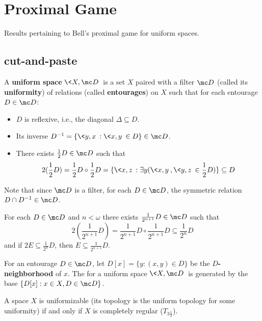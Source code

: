 
\chapter{Proximal Game}

Results pertaining to Bell's proximal game for uniform spaces.

\section{cut-and-paste}


\begin{defn}
  A \textbf{uniform space} $\<X,\mc D\>$ is a set $X$ paired with a filter $\mc D$ (called its \textbf{uniformity}) of relations (called \textbf{entourages}) on $X$ such that for each entourage $D\in \mc D$:
    \begin{itemize}
      \item $D$ is reflexive, i.e., the diagonal $\Delta\subseteq D$.
      \item Its inverse $D^{-1}=\{\<y,x\>:\<x,y\>\in D\}\in \mc D$.
      \item There exists $\frac{1}{2}D\in\mc D$ such that
        \[
          2(\frac{1}{2}D)=\frac{1}{2}D\circ\frac{1}{2}D=\{\<x,z\>:\exists y(\<x,y\>,\<y,z\>\in\frac{1}{2}D)\}\subseteq D
        \]
    \end{itemize}
  Note that since $\mc D$ is a filter, for each $D\in\mc D$, the symmetric relation $D\cap D^{-1}\in \mc D$.
\end{defn}

\begin{prop}
For each $D\in\mc D$ and $n<\omega$ there exists $\frac{1}{2^{n+1}}D\in\mc D$ such that
  \[2(\frac{1}{2^{n+1}}D)=\frac{1}{2^{n+1}}D\circ \frac{1}{2^{n+1}}D\subseteq \frac{1}{2^{n}}D\]
and if $2E\subseteq \frac{1}{2^{n}}D$, then $E\subseteq \frac{1}{2^{n+1}}D$.
\end{prop}

\begin{defn}
  For an entourage $D\in\mc D$, let $D[x]=\{y:(x,y)\in D\}$ be the \textbf{$D$-neighborhood} of $x$. The  for a uniform space $\<X,\mc D\>$ is generated by the base $\{D[x]:x\in X,D\in\mc D\}$.
\end{defn}

\begin{thm}
  A space $X$ is uniformizable (its topology is the uniform topology for some uniformity) if and only if $X$ is completely regular ($T_{3\frac{1}{2}}$).
\end{thm}

